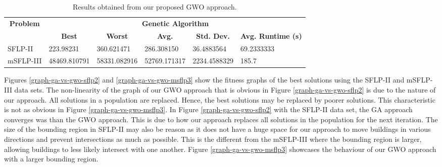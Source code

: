 \begin{table}[h!]
\begin{adjustwidth}{-0.855in}{}
\centering
\begin{tabular}{|l|l|l|l|l|l|}
	\hline
	\multicolumn{1}{|c|}{\multirow{2}{*}{\textbf{Problem}}} & \multicolumn{5}{c|}{\textbf{Genetic Algorithm}}                                                                                                                                                                                            \\ \cline{2-6} 
	\multicolumn{1}{|c|}{}                                  & \multicolumn{1}{c|}{\textbf{Best}} & \multicolumn{1}{c|}{\textbf{Worst}} & \multicolumn{1}{c|}{\textbf{Avg.}} & \multicolumn{1}{c|}{\textbf{Std. Dev.}} & \multicolumn{1}{c|}{\textbf{Avg. Runtime (s)}} \\ \hline
	SFLP-II                                                 & 223.98231                                  & 360.621471                                   & 286.308150                      & 36.4883564                                 & 69.2333333                                   \\ \hline
	mSFLP-III                                               & 48469.810791                                & 58331.082916                                 & 52769.171317          & 2234.4588329                                  & 185.7                                   \\ \hline
\end{tabular}
\end{adjustwidth}
\caption{Results obtained from our proposed GWO approach.}
\label{approach-gwo-results}
\end{table}

Figures \ref{graph-ga-vs-gwo-sflp2} and \ref{graph-ga-vs-gwo-msflp3} show the fitness graphs of the best solutions using the SFLP-II and mSFLP-III data sets. The non-linearity of the graph of our GWO approach that is obvious in Figure \ref{graph-ga-vs-gwo-sflp2} is due to the nature of our approach. All solutions in a population are replaced. Hence, the best solutions may be replaced by poorer solutions. This characteristic is not as obvious in Figure \ref{graph-ga-vs-gwo-msflp3}. In Figure \ref{graph-ga-vs-gwo-sflp2} with the SFLP-II data set, the GA approach converges was than the GWO approach. This is due to how our approach replaces all solutions in the population for the next iteration. The size of the bounding region in SFLP-II may also be reason as it does not have a huge space for our approach to move buildings in various directions and prevent intersections as much as possible. This is the different from the mSFLP-III where the bounding region is larger, allowing buildings to less likely intersect with one another. Figure \ref{graph-ga-vs-gwo-msflp3} showcases the behaviour of our GWO approach with a larger bounding region.

